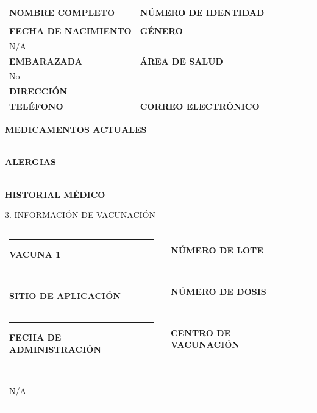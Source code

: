 \documentclass[10pt, a4paper]{article}
\begin{document}
\vspace{5pt}
\begin{tabularx}{\textwidth}{X X}
    \footnotesize\textbf{\textcolor{textgray}{NOMBRE COMPLETO}} & \footnotesize\textbf{\textcolor{textgray}{NÚMERO DE IDENTIDAD}} \\
    \rule{0pt}{15pt} & \\
    \footnotesize\textbf{\textcolor{textgray}{FECHA DE NACIMIENTO}} & \footnotesize\textbf{\textcolor{textgray}{GÉNERO}} \\
    \footnotesize N/A & \\
    \footnotesize\textbf{\textcolor{textgray}{EMBARAZADA}} & \footnotesize\textbf{\textcolor{textgray}{ÁREA DE SALUD}} \\
    \footnotesize No & \\
    \footnotesize\textbf{\textcolor{textgray}{DIRECCIÓN}} & \\
    \footnotesize\textbf{\textcolor{textgray}{TELÉFONO}} & \footnotesize\textbf{\textcolor{textgray}{CORREO ELECTRÓNICO}} \\
\end{tabularx}

\vspace{5pt}
\footnotesize\textbf{\textcolor{textgray}{MEDICAMENTOS ACTUALES}} \\
\rule{0pt}{10pt} \\
\footnotesize\textbf{\textcolor{textgray}{ALERGIAS}} \\
\rule{0pt}{10pt} \\
\footnotesize\textbf{\textcolor{textgray}{HISTORIAL MÉDICO}} \\

\vspace{15pt}

\begin{sectionbox}{3. INFORMACIÓN DE VACUNACIÓN}
\end{sectionbox}

\vspace{5pt}
\begin{tabularx}{\textwidth}{|l X l X}
    \footnotesize\textcolor{ifvblue}{\rule{2pt}{0pt} \textbf{VACUNA 1}} & & \footnotesize\textbf{\textcolor{textgray}{NÚMERO DE LOTE}} & \\
    \footnotesize\textcolor{ifvblue}{\rule{2pt}{0pt} \textbf{SITIO DE APLICACIÓN}} & & \footnotesize\textbf{\textcolor{textgray}{NÚMERO DE DOSIS}} & \\
    \footnotesize\textcolor{ifvblue}{\rule{2pt}{0pt} \textbf{FECHA DE ADMINISTRACIÓN}} & & \footnotesize\textbf{\textcolor{textgray}{CENTRO DE VACUNACIÓN}} & \\
    \footnotesize\rule{2pt}{0pt} N/A & & & \\
\end{tabularx}
\end{document}
